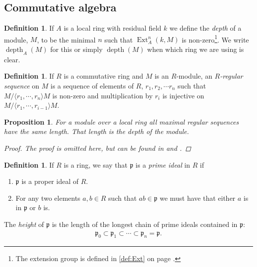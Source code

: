 \documentclass[11pt, a4paper, english]{article}
\newtheorem{prop}[theorem]{Proposition}
\theoremstyle{definition}
\newtheorem{defin}[theorem]{Definition}
\DeclareMathOperator{\Ext}{Ext}
\DeclareMathOperator{\depth}{depth}
\begin{document}
\subsection{Commutative algebra}

\begin{defin}
If $A$ is a local ring with residual field $k$ we define the \textit{depth} of a module, $M$, to be the minimal $n$ such that $\Ext^n_A(k, M)$ is non-zero\footnote{The extension group is defined in \cref{def:Ext} on page \pageref{def:Ext}.}. We write $\depth_A(M)$ for this or simply $\depth(M)$ when which ring we are using is clear.
\end{defin}

\begin{defin}
\label{def:regular_seq}
If $R$ is a commutative ring and $M$ is an $R$-module, an \textit{$R$-regular sequence} on $M$ is a sequence of elements of $R$, $r_1, r_2, \cdots r_n$ such that $M/\langle r_1, \cdots, r_n \rangle M$ is non-zero and multiplication by $r_i$ is injective on $M/\langle r_1, \cdots, r_{i-1} \rangle M$.
\end{defin}

\begin{prop}
For a module over a local ring all maximal regular sequences have the same length. That length is the depth of the module.
\begin{proof}
The proof is omitted here, but can be found in \cite[\href{https://stacks.math.columbia.edu/tag/00LW}{Tag 00LW}]{stacks-project} and \cite[\href{https://stacks.math.columbia.edu/tag/090R}{Tag 090R}]{stacks-project}.
\end{proof}
\end{prop}

\begin{defin}
\label{def:prime_ideal}
If $R$ is a ring, we say that $\mathfrak{p}$ is  a \textit{prime ideal} in $R$ if
\begin{enumerate}
\item $\mathfrak{p}$ is a proper ideal of $R$.
\item For any two elements $a,b \in R$ such that $ab \in \mathfrak{p}$ we must have that either $a$ is in $\mathfrak{p}$ or $b$ is.
\end{enumerate}
The \textit{height} of $\mathfrak{p}$ is the length of the longest chain of prime ideals contained in $\mathfrak{p}$:
\begin{align*}
\mathfrak{p}_0 \subset \mathfrak{p}_1 \subset \cdots \subset \mathfrak{p}_n = \mathfrak{p}.
\end{align*}
\end{defin}
\end{document}
